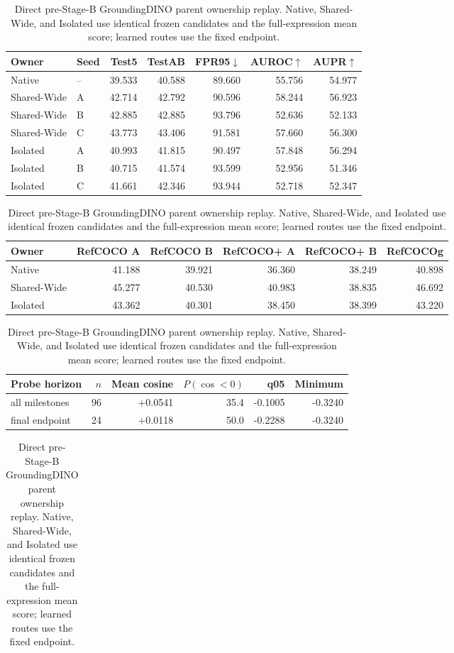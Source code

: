 \begin{table}[t]
\centering
\caption{Direct pre-Stage-B GroundingDINO parent ownership replay.  Native,
Shared-Wide, and Isolated use identical frozen candidates and the
full-expression mean score; learned routes use the fixed endpoint.}
\label{tab:supp-original-parent-ownership}
\scriptsize
\setlength{\tabcolsep}{3.2pt}
\begin{tabular}{llrrrrr}
\toprule
Owner & Seed & Test5 & TestAB & FPR95$\downarrow$ & AUROC$\uparrow$ & AUPR$\uparrow$\\
\midrule
Native & -- & 39.533 & 40.588 & 89.660 & 55.756 & 54.977 \\
Shared-Wide & A & 42.714 & 42.792 & 90.596 & 58.244 & 56.923 \\
Shared-Wide & B & 42.885 & 42.885 & 93.796 & 52.636 & 52.133 \\
Shared-Wide & C & 43.773 & 43.406 & 91.581 & 57.660 & 56.300 \\
Isolated & A & 40.993 & 41.815 & 90.497 & 57.848 & 56.294 \\
Isolated & B & 40.715 & 41.574 & 93.599 & 52.956 & 51.346 \\
Isolated & C & 41.661 & 42.346 & 93.944 & 52.718 & 52.347 \\
\bottomrule
\end{tabular}
\par\smallskip
\begin{tabular}{lrrrrr}
\toprule
Owner & RefCOCO A & RefCOCO B & RefCOCO+ A & RefCOCO+ B & RefCOCOg\\
\midrule
Native & 41.188 & 39.921 & 36.360 & 38.249 & 40.898 \\
Shared-Wide & 45.277 & 40.530 & 40.983 & 38.835 & 46.692 \\
Isolated & 43.362 & 40.301 & 38.450 & 38.399 & 43.220 \\
\bottomrule
\end{tabular}
\par\smallskip
\begin{tabular}{lrrrrr}
\toprule
Probe horizon & $n$ & Mean cosine & $P(\cos<0)$ & q05 & Minimum\\
\midrule
all milestones & 96 & +0.0541 & 35.4 & -0.1005 & -0.3240 \\
final endpoint & 24 & +0.0118 & 50.0 & -0.2288 & -0.3240 \\
\bottomrule
\end{tabular}
\par\smallskip
\begin{tabular}{lrr}

\end{tabular}
\end{table}
